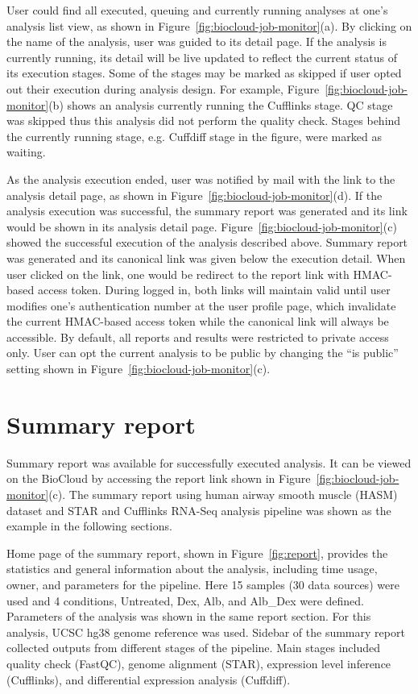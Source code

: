 User could find all executed, queuing and currently running analyses at one's
analysis list view, as shown in Figure~\ref{fig:biocloud-job-monitor}(a). By
clicking on the name of the analysis, user was guided to its detail page. If
the analysis is currently running, its detail will be live updated to reflect
the current status of its execution stages. Some of the stages may be marked as
skipped if user opted out their execution during analysis design. For example,
Figure~\ref{fig:biocloud-job-monitor}(b) shows an analysis currently running
the Cufflinks stage. QC stage was skipped thus this analysis did not perform
the quality check. Stages behind the currently running stage, e.g. Cuffdiff
stage in the figure, were marked as waiting.

As the analysis execution ended, user was notified by mail with the link to the
analysis detail page, as shown in Figure~\ref{fig:biocloud-job-monitor}(d). If
the analysis execution was successful, the summary report was generated and its
link would be shown in its analysis detail page.
Figure~\ref{fig:biocloud-job-monitor}(c) showed the successful execution of the
analysis described above. Summary report was generated and its canonical link
was given below the execution detail. When user clicked on the link, one would
be redirect to the report link with HMAC-based access token. During logged in,
both links will maintain valid until user modifies one's authentication number
at the user profile page, which invalidate the current HMAC-based access token
while the canonical link will always be accessible. By default, all reports and
results were restricted to private access only. User can opt the current
analysis to be public by changing the ``is public'' setting shown in
Figure~\ref{fig:biocloud-job-monitor}(c).



\section{Summary report}

Summary report was available for successfully executed analysis. It can be
viewed on the BioCloud by accessing the report link shown in
Figure~\ref{fig:biocloud-job-monitor}(c). The summary report using human airway
smooth muscle (HASM) dataset and STAR and Cufflinks RNA-Seq analysis pipeline
was shown as the example in the following sections.



Home page of the summary report, shown in Figure~\ref{fig:report}, provides the
statistics and general information about the analysis, including time usage,
owner, and parameters for the pipeline. Here 15 samples (30 data sources) were
used and 4 conditions, Untreated, Dex, Alb, and Alb\_Dex were defined.
Parameters of the analysis was shown in the same report section. For this
analysis, UCSC hg38 genome reference was used. Sidebar of the summary report
collected outputs from different stages of the pipeline. Main stages included
quality check (FastQC), genome alignment (STAR), expression level inference
(Cufflinks), and differential expression analysis (Cuffdiff).


